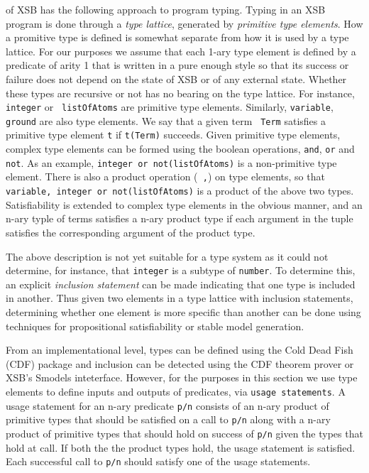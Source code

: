 \version{} of XSB has the following approach to program typing.
Typing in an XSB program is done through a {\em type lattice},
generated by {\em primitive type elements}.  How a promitive type is
defined is somewhat separate from how it is used by a type lattice.
For our purposes we assume that each 1-ary type element is defined by
a predicate of arity 1 that is written in a pure enough style so that
its success or failure does not depend on the state of XSB or of any
external state.  Whether these types are recursive or not has no
bearing on the type lattice.  For instance, {\tt integer} or {\tt
listOfAtoms} are primitive type elements.  Similarly, {\tt variable},
{\tt ground} are also type elements.  We say that a given term {\tt
Term} satisfies a primitive type element {\tt t} if {\tt t(Term)}
succeeds.  Given primitive type elements, complex type elements can be
formed using the boolean operations, {\tt and}, {\tt or} and {\tt
not}.  As an example, {\tt integer or not(listOfAtoms)} is a
non-primitive type element.  There is also a product operation ({\tt
,}) on type elements, so that {\tt variable, integer or
not(listOfAtoms)} is a product of the above two types.  
Satisfiability is extended to complex type elements in the obvious
manner, and an n-ary typle of terms satisfies a n-ary product type if
each argument in the tuple satisfies the corresponding argument of the
product type.

The above description is not yet suitable for a type system as it
could not determine, for instance, that {\tt integer} is a subtype of
{\tt number}.  To determine this, an explicit {\em inclusion
statement} can be made indicating that one type is included in
another.  Thus given two elements in a type lattice with inclusion
statements, determining whether one element is more specific than
another can be done using techniques for propositional satisfiability
or stable model generation.

From an implementational level, types can be defined using the Cold
Dead Fish (CDF) package and inclusion can be detected using the CDF
theorem prover or XSB's Smodels inteterface.  However, for the
purposes in this section we use type elements to define inputs and
outputs of predicates, via {\tt usage statements}.  A usage statement
for an n-ary predicate {\tt p/n} consists of an n-ary product of
primitive types that should be satisfied on a call to {\tt p/n} along
with a n-ary product of primitive types that should hold on success of
{\tt p/n} given the types that hold at call.  If both the the product
types hold, the usage statement is satisfied.  Each successful call to
{\tt p/n} should satisfy one of the usage statements.

